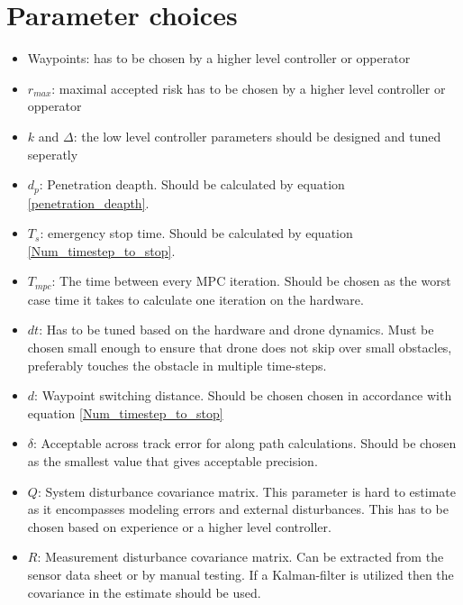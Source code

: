 \section{Parameter choices}
\begin{itemize}
    \item Waypoints: has to be chosen by a higher level controller or opperator
    \item $r_{max}$: maximal accepted risk has to be chosen by a higher level controller or opperator
    \item $k$ and $\Delta$: the low level controller parameters should be designed and tuned seperatly
    \item $d_p$: Penetration deapth. Should be calculated by equation \eqref{penetration_deapth}.
    \item $T_s$: emergency stop time. Should be calculated by equation \eqref{Num_timestep_to_stop}.
    \item $T_{mpc}$: The time between every MPC iteration. Should be chosen as the worst case time it takes to calculate one iteration on the hardware. 
    \item $dt$: Has to be tuned based on the hardware and drone dynamics. Must be chosen small enough to ensure that drone does not skip over small obstacles, preferably touches the obstacle in multiple time-steps. 
    \item $d$: Waypoint switching distance. Should be chosen chosen in accordance with equation \eqref{Num_timestep_to_stop}
    \item $\delta$: Acceptable across track error for along path calculations. Should be chosen as the smallest value that gives acceptable precision. 
    \item $Q$: System disturbance covariance matrix. This parameter is hard to estimate as it encompasses modeling errors and external disturbances. This has to be chosen based on experience or a higher level controller.
    \item $R$: Measurement disturbance covariance matrix. Can be extracted from the sensor data sheet or by manual testing. If a Kalman-filter is utilized then the covariance in the estimate should be used.
    
\end{itemize}